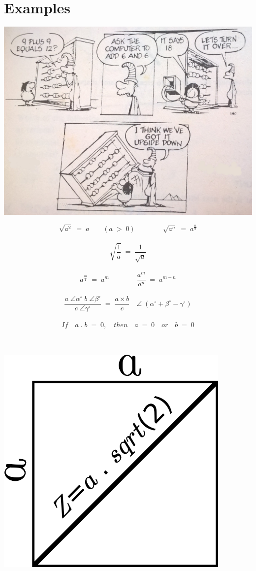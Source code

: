 \section{Examples}
\begin{minipage}{\linewidth}
	\includegraphics[scale=0.2]{./image/Math/upsidedown.jpg}
\end{minipage}
\vspace{1cm}
\[\sqrt{a^2} \; = \; a \qquad (a \; > \; 0) \qquad \qquad \sqrt{a^n} \; = \; a^{\frac{n}{2}}\] \\
\[\sqrt{\frac{1}{a}} \; = \; \frac{1}{\sqrt{a}}\] \\
\[a^{\frac{m}{1}} \; = \; a^m \qquad \qquad \frac{a^m}{a^n} \; = \; a^{m-n}\] \\
\[\frac{a \; \angle \alpha^\circ \; b \; \angle \beta^\circ}{c \; \angle \gamma^\circ} \; = \; \frac{a \times b}{c} \quad \angle \; (\alpha^\circ + \beta^\circ - \gamma^\circ)\]
\\
\[If \quad a \; . \; b \; = \; 0, \quad then \quad a \; = \; 0 \quad or \quad b \; = \; 0\]
\\
\\
\begin{minipage}{0.60\linewidth}
	\includegraphics[scale=0.5]{./image/Math/squareproperty.png}
\end{minipage}
